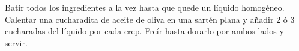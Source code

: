Batir todos los ingredientes a la vez hasta que quede un líquido homogéneo.
Calentar una cucharadita de aceite de oliva en una sartén plana y añadir 2 ó 3 cucharadas del líquido por cada crep. Freír hasta dorarlo por ambos lados y servir.
